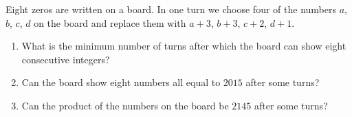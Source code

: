 Eight zeros are written on a board. In one turn we choose four of the numbers $a$, $b$, $c$, $d$ on the board and replace them with $a+3$, $b+3$, $c+2$, $d+1$.
\begin{enumerate}
\item[(a)] What is the minimum number of turns after which the board can show eight consecutive integers?
\item[(b)] Can the board show eight numbers all equal to $2015$ after some turns?
\item[(c)] Can the product of the numbers on the board be $2145$ after some turns?
\end{enumerate}
